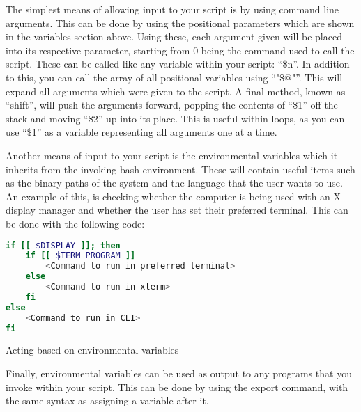 			The simplest means of allowing input to your script is by using command line arguments. 
			This can be done by using the positional parameters which are shown in the variables section above. 
			Using these, each argument given will be placed into its respective parameter, starting from 0 being the command used to call the script. 
			These can be called like any variable within your script: ``\$n''.
			In addition to this, you can call the array of all positional variables using ``"\$@"''. 
			This will expand all arguments which were given to the script. 
			A final method, known as ``shift'', will push the arguments forward, popping the contents of ``\$1'' off the stack and moving ``\$2'' up into its place. 
			This is useful within loops, as you can use ``\$1'' as a variable representing all arguments one at a time. 

			Another means of input to your script is the environmental variables which it inherits from the invoking bash environment. 
			These will contain useful items such as the binary paths of the system and the language that the user wants to use. 
			An example of this, is checking whether the computer is being used with an X display manager and whether the user has set their preferred terminal.  
			This can be done with the following code:
			\begin{code}
			\begin{lstlisting}[language=bash]
if [[ $DISPLAY ]]; then
	if [[ $TERM_PROGRAM ]]
		<Command to run in preferred terminal>
	else
		<Command to run in xterm>
	fi
else
	<Command to run in CLI>
fi
			\end{lstlisting}
			\label{code:checkingEnvironmentalVariables}
			\caption{Acting based on environmental variables}
			\end{code}
			Finally, environmental variables can be used as output to any programs that you invoke within your script. 
			This can be done by using the export command, with the same syntax as assigning a variable after it. 
			
